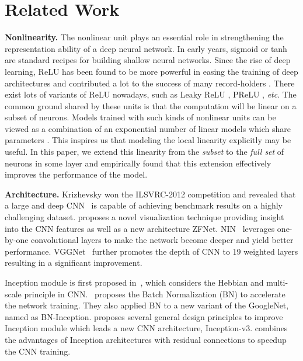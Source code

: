 \documentclass[10pt,twocolumn,letterpaper]{article}
\begin{document}
\section{Related Work}

\textbf{Nonlinearity.}
The nonlinear unit plays an essential role in strengthening the representation ability of a deep neural network. In early years, sigmoid or tanh are standard recipes for building shallow neural networks. Since the rise of deep learning, ReLU \cite{glorot2011deep} has been found to be more powerful in easing the training of deep architectures and contributed a lot to the success of many record-holders \cite{krizhevsky2012imagenet,simonyan2014very,szegedy2016rethinking,szegedy2017inception,he2016deep}. There exist lots of variants of ReLU nowadays, such as Leaky ReLU \cite{maas2013rectifier}, PReLU \cite{he2015delving}, \emph{etc}. The common ground shared by these units is that the computation will be linear on a subset of neurons.  Models trained with such kinds of nonlinear units can be viewed as a combination of an exponential number of linear models which share parameters \cite{nair2010rectified}. This inspires us that modeling the local linearity explicitly may be useful. In this paper, we extend this linearity from the \textit{subset} to the \textit{full set} of neurons in some layer and empirically found that this extension effectively improves the performance of the model.


\textbf{Architecture.}
Krizhevsky won the ILSVRC-2012 competition and revealed that a large and deep CNN~\cite{krizhevsky2012imagenet} is capable of achieving benchmark results on a highly challenging dataset.
\cite{zeiler2014visualizing} proposes a novel visualization technique providing insight into the CNN features as well as a new architecture ZFNet.
NIN~\cite{lin2013network} leverages one-by-one convolutional layers to make the network become deeper and yield better performance.
VGGNet~\cite{simonyan2014very} further promotes the depth of CNN to 19 weighted layers resulting in a significant improvement.


Inception module is first proposed in~\cite{szegedy2015going}, which considers the Hebbian and multi-scale principle in CNN.
\cite{ioffe2015batch}~proposes the Batch Normalization (BN) to accelerate the network training. They also applied BN to a new variant of the GoogleNet, named as BN-Inception.
\cite{szegedy2016rethinking} proposes several general design principles to improve Inception module which leads a new CNN architecture, Inception-v3.
\cite{szegedy2017inception} combines the advantages of Inception architectures with residual connections to speedup the CNN training.
\end{document}
